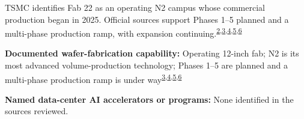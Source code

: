 \begin{minipage}[t][0.90\textheight][t]{\textwidth}
\begin{minipage}[t]{\textwidth}
\begin{minipage}[t]{0.32\textwidth}
\medskip
{\footnotesize TSMC identifies Fab 22 as an operating N2 campus whose commercial production began in 2025. Official sources support Phases 1--5 planned and a multi-phase production ramp, with expansion continuing.\nobreak\textsuperscript{\href{\detokenize{https://www.tsmc.com/english/aboutTSMC/TSMC_Fabs}}{\textcolor{accent}{2}},\href{\detokenize{https://investor.tsmc.com/sites/ir/sec-filings/2025_20F}\%\detokenize{20Report.pdf}}{\textcolor{accent}{3}},\href{\detokenize{https://www.stsp.gov.tw/attached/Letter/Ebook/316/files/basic-html/page5.html}}{\textcolor{accent}{4}},\href{\detokenize{https://www.tsmc.com/english/dedicatedFoundry/technology/logic/l_2nm}}{\textcolor{accent}{5}},\href{\detokenize{https://investor.tsmc.com/chinese/encrypt/files/encrypt_file/reports/2026-04/3cef85204275f94fd111485cfdf4adb3c0263c45/TSMC}\%\detokenize{201Q26}\%\detokenize{20Transcript.pdf}}{\textcolor{accent}{6}}}\par}
\medskip
{\footnotesize\textbf{Documented wafer-fabrication capability:} Operating 12-inch fab; N2 is its most advanced volume-production technology; Phases 1--5 are planned and a multi-phase production ramp is under way\nobreak\textsuperscript{\href{\detokenize{https://investor.tsmc.com/sites/ir/sec-filings/2025_20F}\%\detokenize{20Report.pdf}}{\textcolor{accent}{3}},\href{\detokenize{https://www.stsp.gov.tw/attached/Letter/Ebook/316/files/basic-html/page5.html}}{\textcolor{accent}{4}},\href{\detokenize{https://www.tsmc.com/english/dedicatedFoundry/technology/logic/l_2nm}}{\textcolor{accent}{5}},\href{\detokenize{https://investor.tsmc.com/chinese/encrypt/files/encrypt_file/reports/2026-04/3cef85204275f94fd111485cfdf4adb3c0263c45/TSMC}\%\detokenize{201Q26}\%\detokenize{20Transcript.pdf}}{\textcolor{accent}{6}}}\par}
\end{minipage}
\end{minipage}
\par\vspace{0.65em}
\medskip
{\footnotesize\textbf{Named data-center AI accelerators or programs:} None identified in the sources reviewed.\par}
\medskip

\end{minipage}
